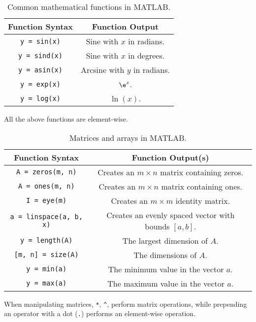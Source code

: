 \documentclass{article}
\begin{document}
\begin{table}[H]
    \centering
    \begin{tabular}{c | c}
        \toprule
        Function Syntax         & Function Output              \\
        \midrule
        \lstinline!y = sin(x)!  & Sine with $x$ in radians.    \\
        \lstinline!y = sind(x)! & Sine with $x$ in degrees.    \\
        \lstinline!y = asin(x)! & Arcsine with $y$ in radians. \\
        \lstinline!y = exp(x)!  & $\e^x$.                      \\
        \lstinline!y = log(x)!  & $\ln{\left( x \right)}$.     \\
        \bottomrule
    \end{tabular}
    \caption{Common mathematical functions in MATLAB.}
\end{table}
All the above functions are element-wise.
\begin{table}[H]
    \centering
    \begin{tabular}{c | c}
        \toprule
        Function Syntax                   & Function Output(s)                                               \\
        \midrule
        \lstinline!A = zeros(m, n)!       & Creates an $m \times n$ matrix containing zeros.                 \\
        \lstinline!A = ones(m, n)!        & Creates an $m \times n$ matrix containing ones.                  \\
        \lstinline!I = eye(m)!            & Creates an $m \times m$ identity matrix.                         \\
        \lstinline!a = linspace(a, b, x)! & Creates an evenly spaced vector with bounds $\left[a, b\right]$. \\
        \lstinline!y = length(A)!         & The largest dimension of $A$.                                    \\
        \lstinline![m, n] = size(A)!      & The dimensions of $A$.                                           \\
        \lstinline!y = min(a)!            & The minimum value in the vector $a$.                             \\
        \lstinline!y = max(a)!            & The maximum value in the vector $a$.                             \\
        \bottomrule
    \end{tabular}
    \caption{Matrices and arrays in MATLAB.}
\end{table}
When manipulating matrices, \verb!*!, \verb!^!, perform matrix operations, while prepending an operator with a dot (\verb!.!) performs an element-wise operation.
\end{document}
